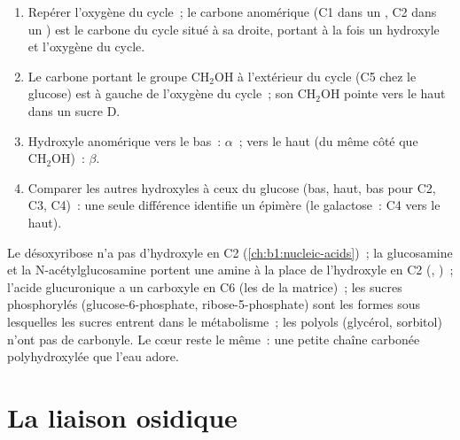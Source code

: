 \begin{method}\label{met:b1:carbohydrates:haworth}
\begin{enumerate}
  \item Repérer l'oxygène du cycle~; le carbone anomérique (C1 dans un
        , C2 dans un ) est le carbone du cycle situé à sa
        droite, portant à la fois un hydroxyle et l'oxygène du cycle.
  \item Le carbone portant le groupe $\mathrm{CH_2OH}$ à l'extérieur du
        cycle (C5 chez le glucose) est à gauche de l'oxygène du cycle~;
        son $\mathrm{CH_2OH}$ pointe vers le haut dans un sucre D.
  \item Hydroxyle anomérique vers le bas~: $\alpha$~; vers le haut (du
        même côté que $\mathrm{CH_2OH}$)~: $\beta$.
  \item Comparer les autres hydroxyles à ceux du glucose (bas, haut, bas
        pour C2, C3, C4)~: une seule différence identifie un épimère (le
        galactose~: C4 vers le haut).
\end{enumerate}
\end{method}

\begin{example}\label{ex:b1:carbohydrates:derivatives}
Le désoxyribose n'a pas d'hydroxyle en C2
(\cref{ch:b1:nucleic-acids})~; la glucosamine et la
N-acétylglucosamine portent une amine à la place de l'hydroxyle en C2
(, )~; l'acide glucuronique a un carboxyle en C6
(les  de la matrice)~; les sucres phosphorylés
(glucose-6-phosphate, ribose-5-phosphate) sont les formes sous
lesquelles les sucres entrent dans le métabolisme~; les polyols
(glycérol, sorbitol) n'ont pas de carbonyle. Le cœur reste le même~:
une petite chaîne carbonée polyhydroxylée que l'eau adore.
\end{example}

\section{La liaison osidique}

